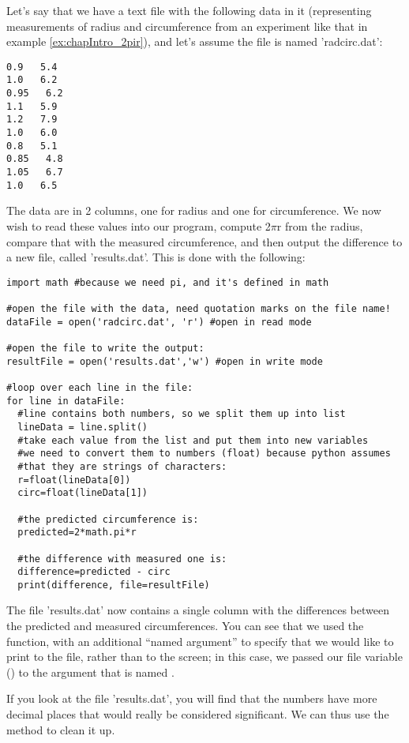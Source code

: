 Let's say that we have a text file with the following data in it (representing measurements of radius and circumference from an experiment like that in example \ref{ex:chapIntro_2pir}), and let's assume the file is named 'radcirc.dat':
\begin{verbatim}
0.9   5.4
1.0   6.2
0.95   6.2
1.1   5.9
1.2   7.9
1.0   6.0
0.8   5.1
0.85   4.8
1.05   6.7
1.0   6.5
\end{verbatim}
The data are in 2 columns, one for radius and one for circumference. We now wish to read these values into our program, compute 2$\pi$r from the radius, compare that with the measured circumference, and then output the difference to a new file, called 'results.dat'. This is done with the following:
\begin{lstlisting}[frame=single] 
import math #because we need pi, and it's defined in math

#open the file with the data, need quotation marks on the file name!
dataFile = open('radcirc.dat', 'r') #open in read mode

#open the file to write the output:
resultFile = open('results.dat','w') #open in write mode

#loop over each line in the file:
for line in dataFile:
  #line contains both numbers, so we split them up into list
  lineData = line.split()
  #take each value from the list and put them into new variables
  #we need to convert them to numbers (float) because python assumes
  #that they are strings of characters:
  r=float(lineData[0])
  circ=float(lineData[1])
  
  #the predicted circumference is:
  predicted=2*math.pi*r
  
  #the difference with measured one is:
  difference=predicted - circ
  print(difference, file=resultFile)

\end{lstlisting}
The file 'results.dat' now contains a single column with the differences between the predicted and measured circumferences. You can see that we used the  function, with an additional ``named argument'' to specify that we would like to print to the file, rather than to the screen; in this case, we passed our file variable () to the argument that is named .

If you look at the file 'results.dat', you will find that the numbers have more decimal places that would really be considered significant. We can thus use the  method to clean it up.

